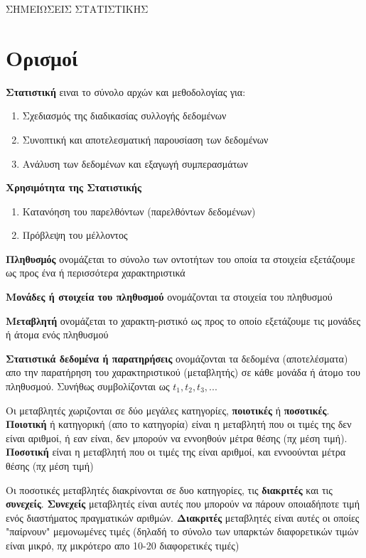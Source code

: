 \documentclass[a4paper,12pt]{article}                      %
\begin{document}
\SetWatermarkFontSize{90pt}					%

\begin{center}
\LARGE{ΣΗΜΕΙΩΣΕΙΣ ΣΤΑΤΙΣΤΙΚΗΣ}
\end{center}

\section{Ορισμοί}
\begin{multicols}{2}
\textbf{Στατιστική} ειναι το σύνολο αρχών και μεθοδολογίας για:
\begin{enumerate}
\item Σχεδιασμός της διαδικασίας συλλογής δεδομένων
\item Συνοπτική και αποτελεσματική παρουσίαση των δεδομένων
\item Ανάλυση των δεδομένων και εξαγωγή συμπερασμάτων
\end{enumerate}

\textbf{Χρησιμότητα της Στατιστικής}
\begin{enumerate}
\item Κατανόηση του παρελθόντων (παρελθόντων δεδομένων)
\item Πρόβλεψη του μέλλοντος
\end{enumerate}

\textbf{Πληθυσμός} ονομάζεται το σύνολο των οντοτήτων  του οποία τα στοιχεία εξετάζουμε ως προς ένα ή περισσότερα χαρακτηριστικά

\textbf{Μονάδες ή στοιχεία του πληθυσμού} ονομάζονται τα στοιχεία του πληθυσμού

\textbf{Μεταβλητή} ονομάζεται το χαρακτη-ριστικό ως προς το οποίο εξετάζουμε τις μονάδες ή άτομα ενός πληθυσμού

\textbf{Στατιστικά δεδομένα ή παρατηρήσεις} ονομάζονται τα δεδομένα (αποτελέσματα) απο την παρατήρηση του χαρακτηριστικού (μεταβλητής) σε κάθε μονάδα ή άτομο του πληθυσμού. Συνήθως συμβολίζονται ως $ t_1, t_2, t_3,... $

Οι μεταβλητές χωριζονται σε δύο μεγάλες κατηγορίες, \textbf{ποιοτικές} ή \textbf{ποσοτικές}. \textbf{Ποιοτική} ή κατηγορική (απο το κατηγορία) είναι η μεταβλητή που οι τιμές της δεν είναι αριθμοί, ή εαν είναι, δεν μπορούν να εννοηθούν μέτρα θέσης (πχ μέση τιμή). \textbf{Ποσοτική} είναι η μεταβλητή που οι τιμές της είναι αριθμοί, και εννοούνται μέτρα θέσης (πχ μέση τιμή)

Οι ποσοτικές μεταβλητές διακρίνονται σε δυο κατηγορίες, τις \textbf{διακριτές} και τις \textbf{συνεχείς}. \textbf{Συνεχείς} μεταβλητές είναι αυτές που μπορούν να πάρουν οποιαδήποτε τιμή ενός διαστήματος πραγματικών αριθμών. \textbf{Διακριτές} μεταβλητές είναι αυτές οι οποίες "παίρνουν" μεμονωμένες τιμές (δηλαδή το σύνολο των υπαρκτών διαφορετικών τιμών είναι μικρό, πχ μικρότερο απο 10-20 διαφορετικές τιμές)


\end{multicols}
\end{document}

